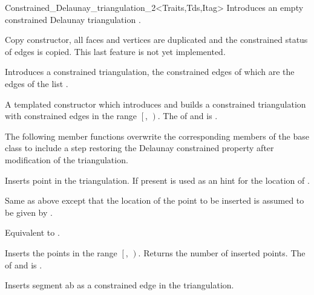 \begin{ccRefClass}{Constrained_Delaunay_triangulation_2<Traits,Tds,Itag>}
{Introduces an empty constrained Delaunay triangulation \ccVar.}

 {Copy constructor, all faces and vertices
are duplicated and  the constrained status of edges
is copied. This last feature is not yet implemented.}

{Introduces a constrained triangulation, the constrained edges of which
are the edges of the list .}


{A templated constructor which introduces and builds
 a constrained triangulation with constrained edges in the range 
$\left[\right.$, $\left.\right)$.
\ccPrecond The  of  and 
 is .}



The following member functions overwrite the corresponding
members of the base class to include a step restoring
 the Delaunay constrained
property after modification of the triangulation.

{ Inserts point  in the triangulation. 
If present  is used as an hint
for the location of .}

{Same as above except that the location of the point
  to be inserted is assumed to be given by
.}

{Equivalent to .}

{Inserts the points in the range
 $\left[\right.$, $\left.\right)$.
 Returns the number of inserted points.
 \ccPrecond The  of  and 
 is .}

{ Inserts segment ab as a constrained edge in the triangulation. }


\end{ccRefClass}
